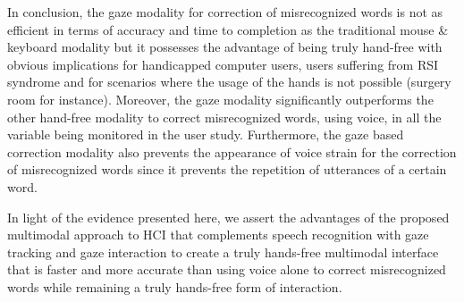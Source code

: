 \documentclass[]{article}
\begin{document}
In conclusion, the gaze modality for correction of misrecognized words is not as efficient in terms of accuracy and time
to completion as the traditional mouse \& keyboard modality but it possesses the advantage of being truly hand-free with
obvious  implications for handicapped computer users, users suffering from RSI syndrome and for scenarios where the
usage of the hands is not possible (surgery room for instance). Moreover, the gaze modality significantly outperforms
the other hand-free modality to correct misrecognized words, using voice, in all the variable being monitored in the
user study. Furthermore, the gaze based correction modality also prevents the appearance of voice strain for the correction
of misrecognized words since it prevents the  repetition of utterances of a certain word.

In light of the evidence presented here, we assert the advantages of the proposed multimodal approach to HCI that
complements speech recognition with gaze tracking and gaze interaction to create a truly hands-free multimodal interface that is
faster and more accurate than using voice alone to correct misrecognized words while remaining a truly hands-free form
of interaction.




\end{document}
